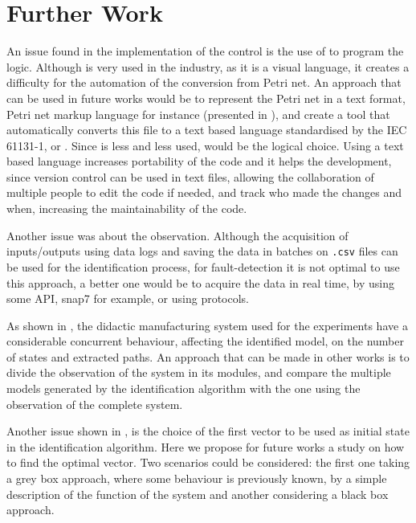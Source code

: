 \section{Further Work}
An issue found in the implementation of the control is the use of \LD{} to
program the logic. Although \LD{} is very used
in the industry, as it is a visual language, it creates a difficulty for the
automation of the conversion from Petri net. An approach that can be used in
future works would be to represent the Petri net in a text format, Petri net
markup language for instance (presented in \cite{weber2003petri}), and create a
tool that automatically converts this file to a text based language standardised
by the IEC 61131-1, \IL{} or \ST{}. Since \IL{} is less and less used, \ST{}
would be the logical choice. Using a text based language increases portability
of the code and it helps the development, since version control can be used in
text files, allowing the collaboration of multiple people to edit the code if
needed, and track who made the changes and when, increasing the maintainability
of the code.



Another issue was about the observation. Although the acquisition of
inputs\slash outputs using data logs and saving the data in batches on
\verb|.csv| files can be used for the identification process, for
fault-detection it is not optimal to use this approach, a better one would be to
acquire the data in real time, by using some API, snap7 for example, or using
\SCADA{} protocols.

As shown in , the didactic manufacturing system used for the
experiments have a considerable concurrent behaviour, affecting the identified
model, on the number of states and extracted paths. An approach that can be made
in other works is to divide the observation of the system in its modules, and
compare the multiple models generated by the identification algorithm with the
one using the observation of the complete system.

Another issue shown in , is the choice of the first
vector to be used as initial state in the identification algorithm. Here we
propose for future works a study on how to find the optimal vector. Two
scenarios could be considered: the first one taking a grey box approach, where some behaviour
is previously known, by a simple description of the function of the system and another considering a black box approach.

